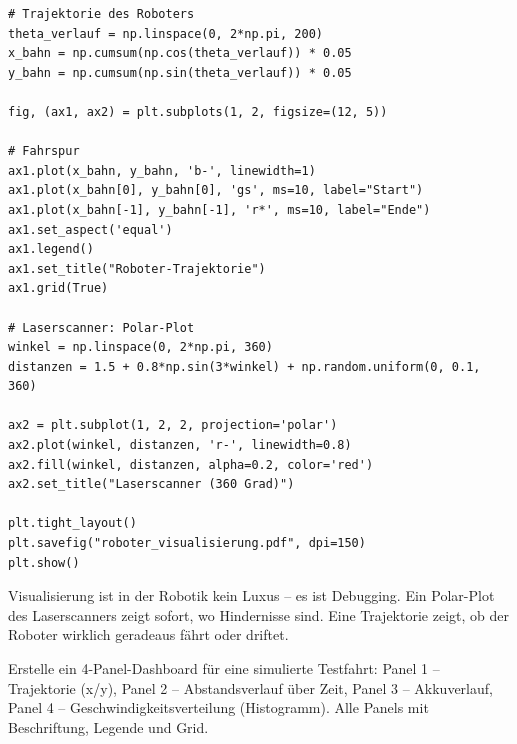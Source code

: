 \begin{lstlisting}
# Trajektorie des Roboters
theta_verlauf = np.linspace(0, 2*np.pi, 200)
x_bahn = np.cumsum(np.cos(theta_verlauf)) * 0.05
y_bahn = np.cumsum(np.sin(theta_verlauf)) * 0.05

fig, (ax1, ax2) = plt.subplots(1, 2, figsize=(12, 5))

# Fahrspur
ax1.plot(x_bahn, y_bahn, 'b-', linewidth=1)
ax1.plot(x_bahn[0], y_bahn[0], 'gs', ms=10, label="Start")
ax1.plot(x_bahn[-1], y_bahn[-1], 'r*', ms=10, label="Ende")
ax1.set_aspect('equal')
ax1.legend()
ax1.set_title("Roboter-Trajektorie")
ax1.grid(True)

# Laserscanner: Polar-Plot
winkel = np.linspace(0, 2*np.pi, 360)
distanzen = 1.5 + 0.8*np.sin(3*winkel) + np.random.uniform(0, 0.1, 360)

ax2 = plt.subplot(1, 2, 2, projection='polar')
ax2.plot(winkel, distanzen, 'r-', linewidth=0.8)
ax2.fill(winkel, distanzen, alpha=0.2, color='red')
ax2.set_title("Laserscanner (360 Grad)")

plt.tight_layout()
plt.savefig("roboter_visualisierung.pdf", dpi=150)
plt.show()
\end{lstlisting}

\begin{praxis}
Visualisierung ist in der Robotik kein Luxus -- es ist Debugging. Ein Polar-Plot des Laserscanners zeigt sofort, wo Hindernisse sind. Eine Trajektorie zeigt, ob der Roboter wirklich geradeaus fährt oder driftet.
\end{praxis}

\begin{uebung}[title=Projektaufgabe Modul 13: Vollständiges Dashboard]
Erstelle ein 4-Panel-Dashboard für eine simulierte Testfahrt: Panel 1 -- Trajektorie (x/y), Panel 2 -- Abstandsverlauf über Zeit, Panel 3 -- Akkuverlauf, Panel 4 -- Geschwindigkeitsverteilung (Histogramm). Alle Panels mit Beschriftung, Legende und Grid.
\end{uebung}
